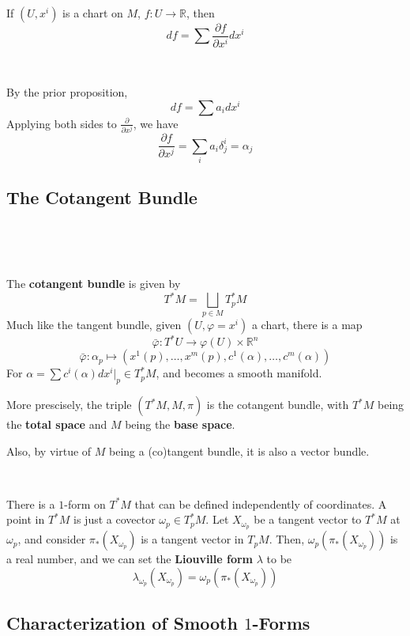 \documentclass{article}
\begin{document}
\begin{proposition}
  \

  If $(U, x^i)$ is a chart on $M$, $f: U \to \mathbb{R}$, then$$df = \sum \frac{\partial f}{\partial x^i} dx^i$$
\end{proposition}

\begin{customproof}
  \

  By the prior proposition, $$df = \sum a_idx^i$$Applying both sides to $\frac{\partial}{\partial x^j}$, we have $$\frac{\partial f}{\partial x^j} = \sum_i a_i \delta_j^i = \alpha_j$$
\end{customproof}

\subsection{The Cotangent Bundle}
\

\begin{definition}
  \

  The \textbf{cotangent bundle} is given by $$T^*M = \bigsqcup_{p \in M} T^*_pM$$Much like the tangent bundle, given $(U, \varphi=x^i)$ a chart, there is a map $$\bar{\varphi}: T^*U \to \varphi(U) \times \mathbb{R}^n$$$$\bar{\varphi}: \alpha_p\mapsto (x^1(p), \dots, x^m(p), c^1(\alpha), \dots, c^m(\alpha))$$For $\alpha = \sum c^i(\alpha)dx^i\vert_p \in T_p^*M$, and becomes a smooth manifold.

  More prescisely, the triple $(T^*M, M, \pi)$ is the cotangent bundle, with $T^*M$ being the \textbf{total space} and $M$ being the \textbf{base space}.

  Also, by virtue of $M$ being a (co)tangent bundle, it is also a vector bundle.
\end{definition}

\begin{example}
  \

  There is a $1$-form on $T^*M$ that can be defined independently of coordinates. A point in $T^*M$ is just a covector $\omega_p \in T_p^*M$. Let $X_{\omega_p}$ be a tangent vector to $T^*M$ at $\omega_p$, and consider $\pi_*(X_{\omega_p})$ is a tangent vector in $T_pM$. Then, $\omega_p(\pi_*(X_{\omega_p}))$ is a real number, and we can set the \textbf{Liouville form} $\lambda$ to be $$\lambda_{\omega_p}(X_{\omega_p}) = \omega_p(\pi_*(X_{\omega_p}))$$
\end{example}

\subsection{Characterization of Smooth $1$-Forms}
\
\end{document}
